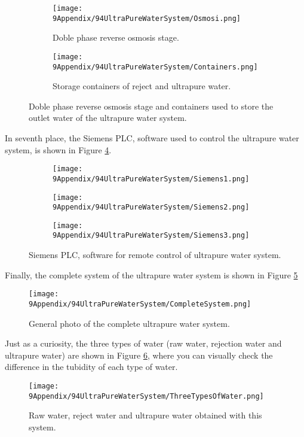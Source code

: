 \begin{figure}
\centering
    \begin{subfigure}[b]{0.3\textwidth}
    \centering
    \texttt{[image: 9Appendix/94UltraPureWaterSystem/Osmosi.png]}  
    \caption{Doble phase reverse osmosis stage.\label{subfig:Osmosi}}
    \end{subfigure}
    \hfill
    \begin{subfigure}[b]{0.5\textwidth}
    \centering
    \texttt{[image: 9Appendix/94UltraPureWaterSystem/Containers.png]}  
    \caption{Storage containers of reject and ultrapure water.\label{subfig:Containers}}
    \end{subfigure}
 \caption{Doble phase reverse osmosis stage and containers used to store the outlet water of the ultrapure water system.}
 \label{subfig:OsmosisContainers}
\end{figure}

In seventh place, the Siemens PLC, software used to control the ultrapure water system, is shown in Figure \ref{fig:Siemens}.

\begin{figure}
\centering
    \begin{subfigure}[b]{0.37\textwidth}
    \centering
    \texttt{[image: 9Appendix/94UltraPureWaterSystem/Siemens1.png]}  
    \caption{}
    \end{subfigure}
    \hfill
    \begin{subfigure}[b]{0.3\textwidth}
    \centering
    \texttt{[image: 9Appendix/94UltraPureWaterSystem/Siemens2.png]}  
    \caption{}
    \end{subfigure}
    \hfill
    \begin{subfigure}[b]{0.27\textwidth}
    \centering
    \texttt{[image: 9Appendix/94UltraPureWaterSystem/Siemens3.png]}  
    \caption{}
    \end{subfigure}
 \caption{Siemens PLC, software for remote control of ultrapure water system.}
 \label{fig:Siemens}
\end{figure}

Finally, the complete system of the ultrapure water system is shown in Figure \ref{fig:CompleteSystem}

\begin{figure}[htbp]
\centering
\texttt{[image: 9Appendix/94UltraPureWaterSystem/CompleteSystem.png]}
\caption{General photo of the complete ultrapure water system.\label{fig:CompleteSystem}}
\end{figure}

Just as a curiosity, the three types of water (raw water, rejection water and ultrapure water) are shown in Figure \ref{fig:ThreeTypesOfWater}, where you can visually check the difference in the tubidity of each type of water.

\begin{figure}[htbp]
\centering
\texttt{[image: 9Appendix/94UltraPureWaterSystem/ThreeTypesOfWater.png]}
\caption{Raw water, reject water and ultrapure water obtained with this system.\label{fig:ThreeTypesOfWater}}
\end{figure}
